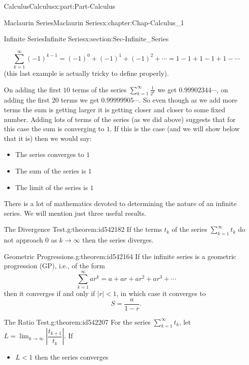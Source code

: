 \documentclass[oneside,10pt,]{book}
\numberwithin{equation}{section}
\begin{document}
\begin{partptx}{Calculus}{}{Calculus}{}{}{x:part:Part-Calculus}
\begin{chapterptx}{Maclaurin Series}{}{Maclaurin Series}{}{}{x:chapter:Chap-Calculus_1}
\begin{sectionptx}{Infinite Series}{}{Infinite Series}{}{}{x:section:Sec-Infinite_Series}
\begin{itemize}[label=\textbullet]
\begin{equation*}
\sum_{k=1}^{\infty}(-1)^{k-1}=(-1)^0+(-1)^1+(-1)^2+\cdots = 1-1+1-1+1-\cdots
\end{equation*}
(this last example is actually tricky to define properly).%
\end{itemize}
%
\par
On adding the first \(10\) terms of the series \(\displaystyle \sum_{k=1}^{\infty}\frac{1}{2^k}\) we get \(0.99902344\cdots\), on adding the first \(20\) terms we get \(0.99999905\cdots\). So even though as we add more terms the sum is getting larger it is getting closer and closer to some fixed number. Adding lots of terms of the series (as we did above) suggests that for this case the sum is converging to \(1\). If this is the case (and we will show below that it is) then we would say:%
\begin{itemize}[label=\textbullet]
\item{}The series converges to \(1\)%
\item{}The sum of the series is \(1\)%
\item{}The limit of the series is \(1\)%
\end{itemize}
%
\par
There is a lot of mathematics devoted to determining the nature of an infinite series. We will mention just three useful results.%
\begin{theorem}{The Divergence Test.}{}{g:theorem:id542182}%
If the terms \(t_k\) of the series \(\displaystyle \sum_{k=1}^{\infty}t_k\) do not approach \(0\) as \(k\to\infty\) then the series diverges.%
\end{theorem}
\begin{theorem}{Geometric Progressions.}{}{g:theorem:id542164}%
If the infinite series is a geometric progression (GP), i.e., of the form%
\begin{equation*}
\sum_{k=1}^{\infty}ar^k = a +ar +ar^2+ar^3 +\cdots
\end{equation*}
then it converges if and only if \(|r|< 1\), in which case it converges to%
\begin{equation*}
S=\frac{a}{1-r}.
\end{equation*}
%
\end{theorem}
\begin{theorem}{The Ratio Test.}{}{g:theorem:id542207}%
For the series \(\displaystyle \sum_{k=1}^{\infty}t_k\), let \(\displaystyle L=\lim_{k\to \infty}\left|\dfrac{t_{k+1}}{t_k}\right|\). If%
\begin{itemize}[label=\textbullet]
\item{}\(L<1\) then the series converges%

\end{itemize}
\end{theorem}
\end{sectionptx}
\end{chapterptx}
\end{partptx}
\end{document}
